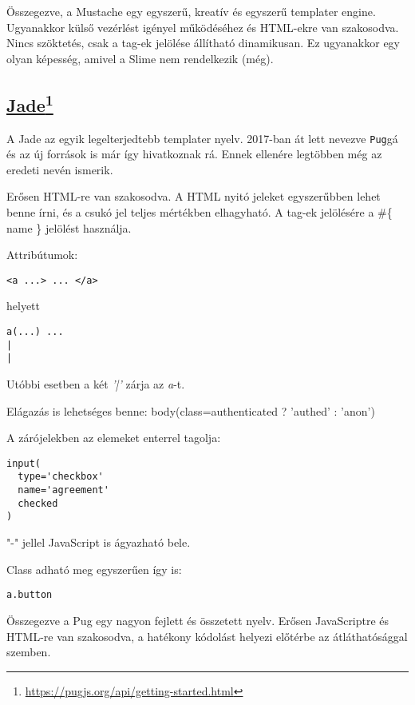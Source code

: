 Összegezve, a Mustache egy egyszerű, kreatív és egyszerű templater engine.
Ugyanakkor külső vezérlést igényel működéséhez és HTML-ekre van szakosodva.
Nincs szöktetés, csak a tag-ek jelölése állítható dinamikusan.
Ez ugyanakkor egy olyan képesség, amivel a Slime nem rendelkezik (még). 


\subsection[Jade]{\href{https://pugjs.org/api/getting-started.html}{Jade}\footnote{\url{https://pugjs.org/api/getting-started.html}}}
\label{sec:jade}
A Jade az egyik legelterjedtebb templater nyelv.
2017-ban át lett nevezve \texttt{Pug}gá és az új források is már így hivatkoznak rá.
Ennek ellenére legtöbben még az eredeti nevén ismerik.

Erősen HTML-re van szakosodva.
A HTML nyitó jeleket egyszerűbben lehet benne írni, és a csukó jel teljes mértékben elhagyható.
A tag-ek jelölésére a \#\{ name \} jelölést használja.

Attribútumok:
\begin{verbatim}
<a ...> ... </a> 
\end{verbatim}
helyett 
\begin{verbatim}
a(...) ...
|
|
\end{verbatim}
Utóbbi esetben a két \textit{'|'} zárja az \textit{a}-t.

Elágazás is lehetséges benne: body(class=authenticated ? 'authed' : 'anon')

A zárójelekben az elemeket enterrel tagolja:
\begin{verbatim}
input(
  type='checkbox'
  name='agreement'
  checked
)
\end{verbatim}

"-" jellel JavaScript is ágyazható bele.

Class adható meg egyszerűen így is:
\begin{verbatim}
a.button
\end{verbatim}

Összegezve a Pug egy nagyon fejlett és összetett nyelv.
Erősen JavaScriptre és HTML-re van szakosodva, a hatékony kódolást helyezi előtérbe az átláthatósággal szemben.


